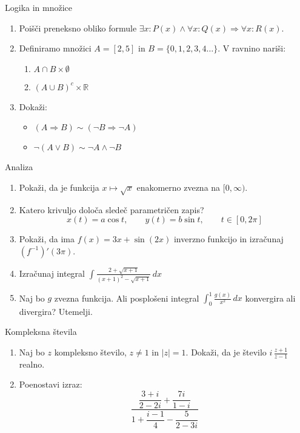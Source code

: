 \begin{frame}{Logika in množice}
	\begin{enumerate}
		\item
		Poišči preneksno obliko formule $\exists x: P(x) \land \forall x: Q(x) \Rightarrow \forall x: R(x)$.
		\item 
		Definiramo množici $A = [ 2,5 ]$ in $B = \{0, 1, 2, 3, 4 \ldots \}$.
		V ravnino nariši:
		\begin{enumerate}
		   \item $A \cap B \times \emptyset$
		   \item $(A \cup B)^c \times \mathbb{R}$
		\end{enumerate}
		
		\item
		Dokaži:
		\begin{itemize}
			\item $(A \Rightarrow B) \sim (\lnot B \Rightarrow \lnot A)$
			\item $\lnot (A \lor B) \sim \lnot A \land \lnot B$
		\end{itemize}
	\end{enumerate}
\end{frame}

\begin{frame}{Analiza}
	\begin{enumerate}
		\item
		Pokaži, da je funkcija $x \mapsto \sqrt{x}$ enakomerno zvezna na $[0,\infty)$.
		\item 
		Katero krivuljo določa sledeč parametričen zapis?
		$$
		   x(t) = a \cos t, \qquad %
		   y(t) = b \sin t, \qquad %
		   t \in [0, 2 \pi]
		$$ 
		\item
		Pokaži, da ima $f(x) = 3x + \sin(2x)$ inverzno funkcijo in izračunaj $(f^{-1})'(3\pi)$.
		
		\item
		Izračunaj integral 
		$\displaystyle \int \frac{2+\sqrt{x+1}}{(x+1)^2-\sqrt{x+1}} \, dx$
		\item 
		Naj bo $g$ zvezna funkcija. Ali posplošeni integral 
		$\int_0^1 \frac{g(x)}{x^2}\,dx$
		konvergira ali divergira? Utemelji.
	\end{enumerate}
\end{frame}

\begin{frame}{Kompleksna števila}
	\begin{enumerate}
		\item
		Naj bo $z$ kompleksno število, $z \ne 1$ in $|z| = 1$.
		Dokaži, da je število \( i \, \frac{z+1}{z-1} \) realno.
		\item
		Poenostavi izraz:
		$$ \frac{\dfrac{3+i}{2-2i} + \dfrac{7i}{1-i}}{1 + \dfrac{i-1}{4} - \dfrac{5}{2-3i}} $$
	\end{enumerate}
\end{frame}